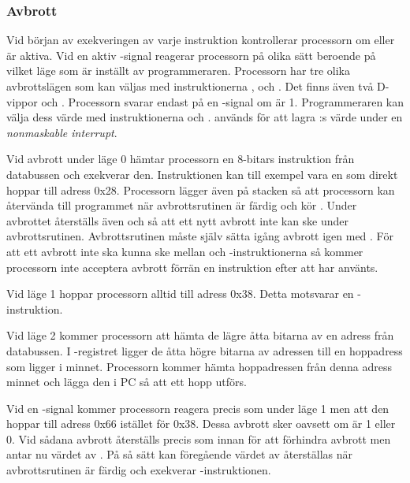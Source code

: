 \documentclass[main.tex]{subfiles}
\begin{document}
\subsubsection{Avbrott}
Vid början av exekveringen av varje instruktion kontrollerar processorn om
 eller  är aktiva. Vid en aktiv -signal reagerar
processorn på olika sätt beroende på vilket läge som är inställt av
programmeraren. Processorn har tre olika avbrottslägen som kan väljas med
instruktionerna ,  och . Det finns även två
D-vippor  och . Processorn svarar endast på en
-signal om  är 1. Programmeraren kan välja dess värde med
instruktionerna  och .  används för att lagra
:s värde under en {\it nonmaskable interrupt}.

Vid avbrott under läge 0 hämtar processorn en 8-bitars instruktion från
databussen och exekverar den. Instruktionen kan till exempel vara en  som direkt hoppar till adress 0x28. Processorn lägger även  på
stacken så att processorn kan återvända till programmet när avbrottsrutinen är
färdig och kör . Under avbrottet återställs även  och
 så att ett nytt avbrott inte kan ske under avbrottsrutinen.
Avbrottsrutinen måste själv sätta igång avbrott igen med . För att ett
avbrott inte ska kunna ske mellan  och -instruktionerna så
kommer processorn inte acceptera avbrott förrän en instruktion efter att
 har använts.

Vid läge 1 hoppar processorn alltid till adress 0x38. Detta motsvarar en
-instruktion.

Vid läge 2 kommer processorn att hämta de lägre åtta bitarna av en adress från
databussen. I -registret ligger de åtta högre bitarna av adressen till
en hoppadress som ligger i minnet. Processorn kommer hämta hoppadressen från
denna adress minnet och lägga den i PC så att ett hopp utförs.

Vid en -signal kommer processorn reagera precis som under läge 1 men
att den hoppar till adress 0x66 istället för 0x38. Dessa avbrott sker oavsett
om  är 1 eller 0. Vid sådana avbrott återställs  precis
som innan för att förhindra avbrott men  antar nu värdet av
. På så sätt kan föregående värdet av  återställas när
avbrottsrutinen är färdig och exekverar -instruktionen.
\end{document}
